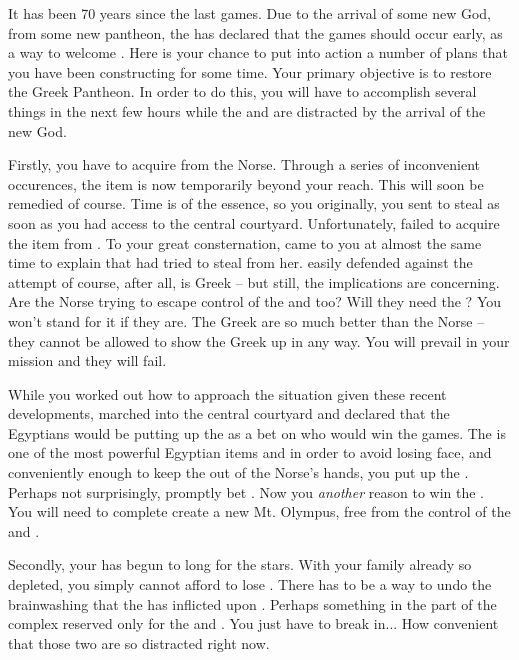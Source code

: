 \documentclass[char]{guardians}
\begin{document}
It has been 70 years since the last games.  Due to the arrival of some new God, from some new pantheon, the \cCaretaker{} has declared that the games should occur early, as a way to welcome \cUnity{\them}. Here is your chance to put into action a number of plans that you have been constructing for some time. Your primary objective is to restore the Greek Pantheon. In order to do this, you will have to accomplish several things in the next few hours while the \cCaretaker{} and \cWarden{} are distracted by the arrival of the new God.

Firstly, you have to acquire \iHammer{} from the Norse. Through a series of inconvenient occurences, the item is now temporarily beyond your reach. This will soon be remedied of course. Time is of the essence, so you originally, you sent \cPandora{} to steal \iHammer{} as soon as you had access to the central courtyard. Unfortunately, \cPandora{\they} failed to acquire the item from \cHel{}. To your great consternation, \cHera{} came to you at almost the same time to explain that \cVal{} had tried to steal \iSandles{} from her. \cHera{} easily defended against the attempt of course, after all, \cHera{\they} is Greek -- but still, the implications are concerning. Are the Norse trying to escape control of the \cCaretaker{} and \cWarden{} too? Will they need the \stone? You won't stand for it if they are. The Greek are so much better than the Norse -- they cannot be allowed to show the Greek up in any way. You will prevail in your mission and they will fail.

While you worked out how to approach the situation given these recent developments, \cOsiris{} marched into the central courtyard and declared that the Egyptians would be putting up the \iNecro{} as a bet on who would win the games. The \iNecro{} is one of the most powerful Egyptian items and in order to avoid losing face, and conveniently enough to keep the \iSandles{} out of the Norse's hands, you put up the \iSandles{}. Perhaps not surprisingly, \cOdin{} promptly bet \iHammer{}. Now you \emph{another} reason to win the \pGames{}. You will need \iHammer{} to complete create a new Mt. Olympus, free from the control of the \cCaretaker{} and \cWarden{}.

Secondly, your \cAthena{\offspring} \cAthena{} has begun to long for the stars. With your family already so depleted, you simply cannot afford to lose \cAthena{\them}. There has to be a way to undo the brainwashing that the \cCaretaker{} has inflicted upon \cAthena{}. Perhaps something in the part of the complex reserved only for the \cCaretaker{} and \cWarden{}. You just have to break in... How convenient that those two are so distracted right now.
\end{document}

